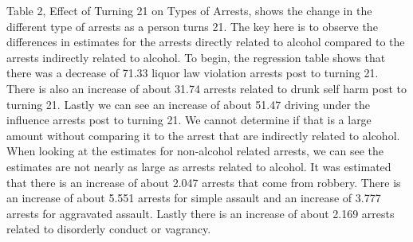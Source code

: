\documentclass[a4paper]{article}
\begin{document}
\par
Table 2, Effect of Turning 21 on Types of Arrests, shows the change in the different type of arrests as a person turns 21. The key here is to observe the differences in estimates for the arrests directly related to alcohol compared to the arrests indirectly related to alcohol. To begin, the regression table shows that there was a decrease of 71.33 liquor law violation arrests post to turning 21. There is also an increase of about 31.74 arrests related to drunk self harm post to turning 21. Lastly we can see an increase of about 51.47 driving under the influence arrests post to turning 21. We cannot determine if that is a large amount without comparing it to the arrest that are indirectly related to alcohol. When looking at the estimates for non-alcohol related arrests, we can see the estimates are not nearly as large as arrests related to alcohol. It was estimated that there is an increase of about 2.047 arrests that come from robbery. There is an increase of about 5.551 arrests for simple assault and an increase of 3.777 arrests for aggravated assault. Lastly there is an increase of about 2.169 arrests related to disorderly conduct or vagrancy.
\end{document}

